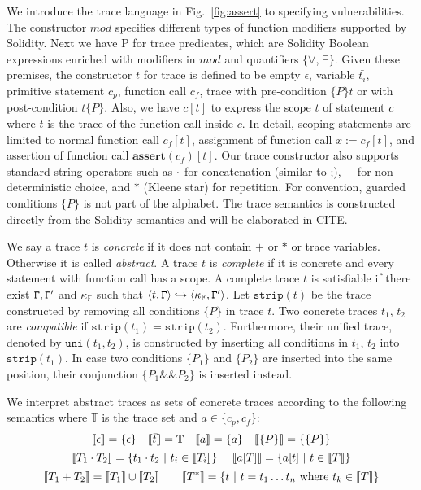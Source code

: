 We introduce the trace language in Fig.~\ref{fig:assert} to specifying vulnerabilities. The constructor $\textit{mod}$ specifies different types of function modifiers supported by Solidity. Next we have P for trace predicates, which are Solidity Boolean expressions enriched with modifiers in  $\textit{mod}$ and quantifiers $\{\forall$, $\exists\}$. Given these premises, the constructor $t$ for trace is defined to be empty $\epsilon$, variable $\bar{t_i}$, primitive statement $c_p$, function call $c_f$, trace with pre-condition $\{P\}t$ or with post-condition $t\{P\}$. Also, we have $c[t]$ to express the scope $t$ of statement $c$ where $t$ is the trace of the function call inside $c$. In detail, scoping statements are limited to normal function call $c_f[t]$, assignment of function call $x := c_f[t]$, and assertion of function call $\textbf{assert}(c_f)[t]$. Our trace constructor also supports standard string operators such as $\cdot$ for concatenation (similar to ;), $+$ for non-deterministic choice, and $*$ (Kleene star) for repetition. For convention, guarded conditions $\{P\}$ is not part of the alphabet. The trace semantics is constructed directly from the Solidity semantics and will be elaborated in CITE.

We say a trace $t$ is \emph{concrete} if it does not contain $+$ or $*$ or trace variables. Otherwise it is called \emph{abstract}. A trace $t$ is \emph{complete} if it is concrete and every statement with function call has a scope. A complete trace $t$ is satisfiable if there exist $\mathtt{\Gamma},\mathtt{\Gamma}'$ and $\kappa_\mathbb{F}$ such that $\langle t,\mathtt{\Gamma} \rangle \hookrightarrow \langle \kappa_{\mathbb{F}},\mathtt{\Gamma}' \rangle$. Let $\texttt{strip}(t)$ be the trace constructed by removing all conditions $\{P\}$ in trace $t$. Two concrete traces $t_1$, $t_2$ are \emph{compatible} if $\texttt{strip}(t_1) = \texttt{strip}(t_2)$. Furthermore, their unified trace, denoted by $\texttt{uni}(t_1,t_2)$, is constructed by inserting all conditions in $t_1$, $t_2$ into $\texttt{strip}(t_1)$. In case two conditions $\{P_1\}$ and $\{P_2\}$ are inserted into the same position, their conjunction $\{P_1 \&\& P_2\}$ is inserted instead.


 We interpret abstract traces as sets of concrete traces according to the following semantics where $\mathbb{T}$ is the trace set and $a \in \{c_p,c_f\}$:
$$
\llbracket \epsilon \rrbracket = \{\epsilon\}~~~\llbracket \bar{t} \rrbracket = \mathbb{T}~~~\llbracket a \rrbracket = \{a\}~~~
\llbracket \{P\} \rrbracket = \{\{P\}\}
$$
$$
\llbracket T_1 \cdot T_2 \rrbracket = \{t_1 \cdot t_2~|~t_i \in \llbracket T_i \rrbracket\}~~~~\llbracket a[T] \rrbracket = \{a[t]~|~t \in \llbracket T \rrbracket\}
$$
$$
\llbracket T_1 + T_2 \rrbracket = \llbracket T_1 \rrbracket \cup \llbracket T_2 \rrbracket
~~~~~~
\llbracket T^* \rrbracket = \{t~|~t = t_1 \ldots t_n \textrm{ where } t_k \in \llbracket T \rrbracket\}
$$

